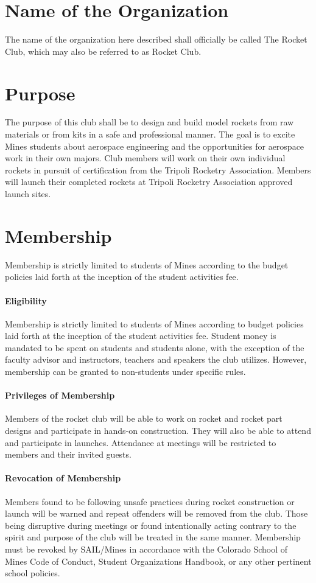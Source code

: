\documentclass[12pt]{article}
\begin{document}
\section{Name of the Organization} 
The name of the organization here described shall officially be called The Rocket Club, which may also be referred to as Rocket Club.

\section{Purpose}
The purpose of this club shall be to design and build model rockets from raw materials or from kits in a safe and professional manner. 
The goal is to excite Mines students about aerospace engineering and the opportunities for aerospace work in their own majors. 
Club members will work on their own individual rockets in pursuit of certification from the Tripoli Rocketry Association. 
Members will launch their completed rockets at Tripoli Rocketry Association approved launch sites.

\section{Membership}
Membership is strictly limited to students of Mines according to the budget policies laid forth at the inception of the student activities fee.

\paragraph{Eligibility}
Membership is strictly limited to students of Mines according to budget policies laid forth at the inception of the student activities fee. 
Student money is mandated to be spent on students and students alone, 
with the exception of the faculty advisor and instructors, 
teachers and speakers the club utilizes. 
However, membership can be granted to non-students under specific rules. 

\paragraph{Privileges of Membership}
Members of the rocket club will be able to work on rocket and rocket part designs and participate in hands-on construction.  
They will also be able to attend and participate in launches.  
Attendance at meetings will be restricted to members and their invited guests.

\paragraph{Revocation of Membership}
Members found to be following unsafe practices during rocket construction or launch will be warned and repeat offenders will be removed from the club.  
Those being disruptive during meetings or found intentionally acting contrary to the spirit and purpose of the club will be treated in the same manner. 
Membership must be revoked by SAIL/Mines in accordance with the Colorado School of Mines Code of Conduct, Student Organizations Handbook, or any other pertinent school policies.
\end{document}
